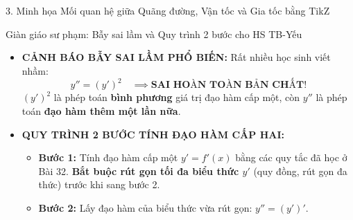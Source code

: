 \documentclass[12pt, a4paper]{article}
\begin{document}
\begin{pedabox}{3. Minh họa Mối quan hệ giữa Quãng đường, Vận tốc và Gia tốc bằng TikZ}
\begin{center}
\end{center}
\end{pedabox}

\begin{scaffoldbox}{Giàn giáo sư phạm: Bẫy sai lầm và Quy trình 2 bước cho HS TB-Yếu}
\begin{itemize}[leftmargin=0.5cm]
    \item \textbf{CẢNH BÁO BẪY SAI LẦM PHỔ BIẾN:}
    Rất nhiều học sinh viết nhầm:
    $$y'' = (y')^2 \quad \implies \textbf{SAI HOÀN TOÀN BẢN CHẤT!}$$
    $(y')^2$ là phép toán \textbf{bình phương} giá trị đạo hàm cấp một, còn $y''$ là phép toán \textbf{đạo hàm thêm một lần nữa}.
    \item \textbf{QUY TRÌNH 2 BƯỚC TÍNH ĐẠO HÀM CẤP HAI:}
    \begin{itemize}[leftmargin=0.4cm]
        \item \textbf{Bước 1:} Tính đạo hàm cấp một $y' = f'(x)$ bằng các quy tắc đã học ở Bài 32. \textbf{Bắt buộc rút gọn tối đa biểu thức $y'$} (quy đồng, rút gọn đa thức) trước khi sang bước 2.
        \item \textbf{Bước 2:} Lấy đạo hàm của biểu thức vừa rút gọn: $y'' = (y')'$.
    \end{itemize}
\end{itemize}
\end{scaffoldbox}
\end{document}
